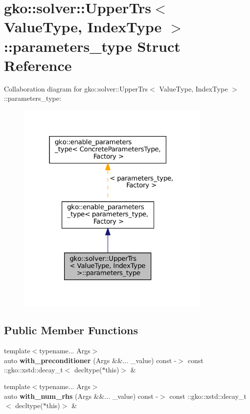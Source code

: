 \hypertarget{structgko_1_1solver_1_1UpperTrs_1_1parameters__type}{}\section{gko\+:\+:solver\+:\+:Upper\+Trs$<$ Value\+Type, Index\+Type $>$\+:\+:parameters\+\_\+type Struct Reference}
\label{structgko_1_1solver_1_1UpperTrs_1_1parameters__type}


Collaboration diagram for gko\+:\+:solver\+:\+:Upper\+Trs$<$ Value\+Type, Index\+Type $>$\+:\+:parameters\+\_\+type\+:
\nopagebreak
\begin{figure}[H]
\begin{center}
\leavevmode
\includegraphics[width=271pt]{structgko_1_1solver_1_1UpperTrs_1_1parameters__type__coll__graph}
\end{center}
\end{figure}
\subsection*{Public Member Functions}
\begin{DoxyCompactItemize}
\item 
\mbox{\label{structgko_1_1solver_1_1UpperTrs_1_1parameters__type_ae70b11e6645e16d516b84bc953007d90}} 
{\footnotesize template$<$typename... Args$>$ }\\auto {\bfseries with\+\_\+preconditioner} (Args \&\&... \+\_\+value) const -\/$>$ const \+::gko\+::xstd\+::decay\+\_\+t$<$ decltype($\ast$this)$>$ \&
\item 
\mbox{\label{structgko_1_1solver_1_1UpperTrs_1_1parameters__type_a66037d566ba00ae2fb23d889cb91174c}} 
{\footnotesize template$<$typename... Args$>$ }\\auto {\bfseries with\+\_\+num\+\_\+rhs} (Args \&\&... \+\_\+value) const -\/$>$ const \+::gko\+::xstd\+::decay\+\_\+t$<$ decltype($\ast$this)$>$ \&
\end{DoxyCompactItemize}
